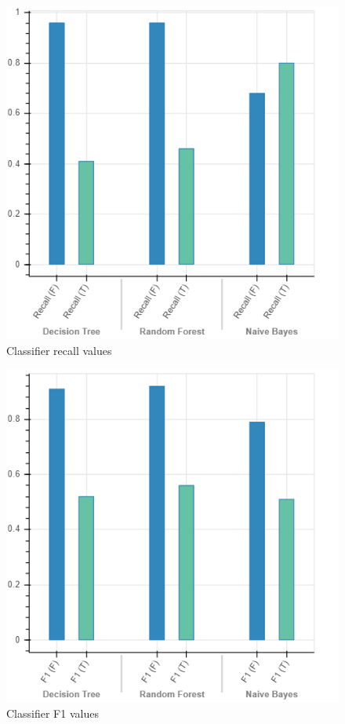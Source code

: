 \documentclass[10pt, conference, compsocconf]{IEEEtran}
\begin{document}
\begin{figure}
  \includegraphics[scale=0.45]{recall}
  \centering
  \caption{Classifier recall values}
  \label{fig:recall}
\end{figure}

\begin{figure}
  \includegraphics[scale=0.45]{F1}
  \centering
  \caption{Classifier F1 values}
  \label{fig:f1}
\end{figure}
\end{document}
